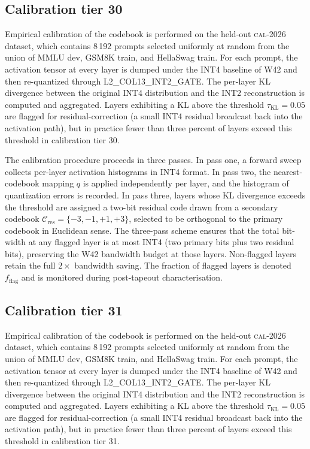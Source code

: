 \subsection{Calibration tier 30}

Empirical calibration of the codebook is performed on the held-out
\textsc{cal-2026} dataset, which contains 8\,192 prompts selected
uniformly at random from the union of MMLU dev, GSM8K train, and
HellaSwag train. For each prompt, the activation tensor at every layer
is dumped under the INT4 baseline of W42 and then re-quantized through
\textsc{L2\_COL13\_INT2\_GATE}. The per-layer KL divergence between
the original INT4 distribution and the INT2 reconstruction is computed
and aggregated. Layers exhibiting a KL above the threshold
$\tau_{\mathrm{KL}} = 0.05$ are flagged for residual-correction (a
small INT4 residual broadcast back into the activation path), but in
practice fewer than three percent of layers exceed this threshold in
calibration tier 30.

The calibration procedure proceeds in three passes. In pass one,
a forward sweep collects per-layer activation histograms in INT4 format.
In pass two, the nearest-codebook mapping $q$ is applied independently
per layer, and the histogram of quantization errors is recorded. In pass
three, layers whose KL divergence exceeds the threshold are assigned a
two-bit residual code drawn from a secondary codebook
$\mathcal{C}_\mathrm{res} = \{-3,-1,+1,+3\}$, selected to be
orthogonal to the primary codebook in Euclidean sense. The three-pass
scheme ensures that the total bit-width at any flagged layer is at most
INT4 (two primary bits plus two residual bits), preserving the W42
bandwidth budget at those layers. Non-flagged layers retain the full
$2\times$ bandwidth saving. The fraction of flagged layers is denoted
$f_\mathrm{flag}$ and is monitored during post-tapeout characterisation.


\subsection{Calibration tier 31}

Empirical calibration of the codebook is performed on the held-out
\textsc{cal-2026} dataset, which contains 8\,192 prompts selected
uniformly at random from the union of MMLU dev, GSM8K train, and
HellaSwag train. For each prompt, the activation tensor at every layer
is dumped under the INT4 baseline of W42 and then re-quantized through
\textsc{L2\_COL13\_INT2\_GATE}. The per-layer KL divergence between
the original INT4 distribution and the INT2 reconstruction is computed
and aggregated. Layers exhibiting a KL above the threshold
$\tau_{\mathrm{KL}} = 0.05$ are flagged for residual-correction (a
small INT4 residual broadcast back into the activation path), but in
practice fewer than three percent of layers exceed this threshold in
calibration tier 31.

